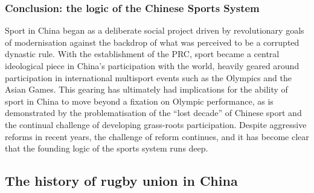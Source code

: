 {\subsubsection{Conclusion: the logic of the Chinese Sports System}

Sport in China began as a deliberate social project driven by revolutionary goals of modernisation against the backdrop of what was perceived to be a corrupted dynastic rule.  With the establishment of the PRC, sport became a central ideological piece in China's participation with the world, heavily geared around participation in international multisport events such as the Olympics and the Asian Games. This gearing has ultimately had implications for the ability of sport in China to move beyond a fixation on Olympic performance, as is demonstrated by the problematisation of the ``lost decade'' of Chinese sport and the continual challenge of developing grass-roots participation.  Despite aggressive reforms in recent years, the challenge of reform continues, and it has become clear that the founding logic of the sports system runs deep.










  \subsection{The history of rugby union in China}



}
